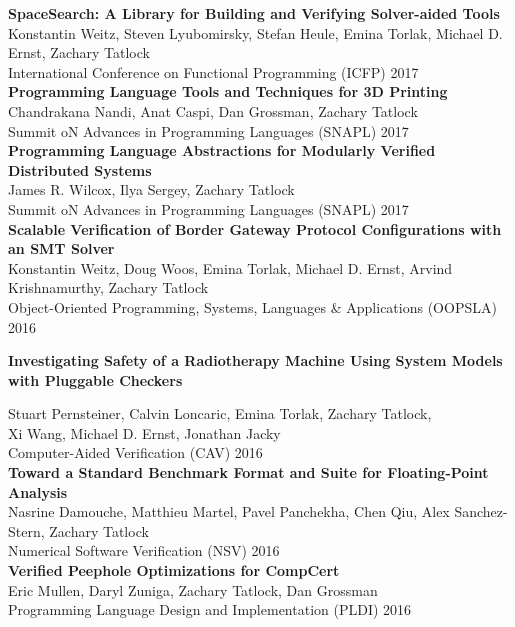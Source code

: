 \documentclass[10pt]{article}
\begin{document}
\textbf{%
SpaceSearch: A Library for Building and Verifying Solver-aided Tools
} \\
Konstantin Weitz, Steven Lyubomirsky, Stefan Heule, Emina Torlak, Michael D. Ernst, Zachary Tatlock \\
International Conference on Functional Programming (ICFP) 2017 \\

\textbf{%
Programming Language Tools and Techniques for 3D Printing
} \\
Chandrakana Nandi, Anat Caspi, Dan Grossman, Zachary Tatlock \\
Summit oN Advances in Programming Languages (SNAPL) 2017 \\

\textbf{%
Programming Language Abstractions for Modularly Verified Distributed Systems
} \\
James R. Wilcox, Ilya Sergey, Zachary Tatlock \\
Summit oN Advances in Programming Languages (SNAPL) 2017 \\

\textbf{%
Scalable Verification of Border Gateway Protocol Configurations with an SMT Solver
} \\
Konstantin Weitz, Doug Woos, Emina Torlak, Michael D. Ernst, Arvind Krishnamurthy, Zachary Tatlock \\
Object-Oriented Programming, Systems, Languages \& Applications (OOPSLA) 2016 \\

\begin{small}
\textbf{%
Investigating Safety of a Radiotherapy Machine Using System Models with Pluggable Checkers
} \\
\end{small}
Stuart Pernsteiner, Calvin Loncaric, Emina Torlak, Zachary Tatlock, \\
Xi Wang, Michael D. Ernst, Jonathan Jacky \\
Computer-Aided Verification (CAV) 2016 \\

\textbf{%
Toward a Standard Benchmark Format and Suite for Floating-Point Analysis
} \\
Nasrine Damouche, Matthieu Martel, Pavel Panchekha, Chen Qiu, Alex Sanchez-Stern, Zachary Tatlock \\
Numerical Software Verification (NSV) 2016 \\

\textbf{%
Verified Peephole Optimizations for CompCert
} \\
Eric Mullen, Daryl Zuniga, Zachary Tatlock, Dan Grossman \\
Programming Language Design and Implementation (PLDI) 2016 \\
\end{document}
